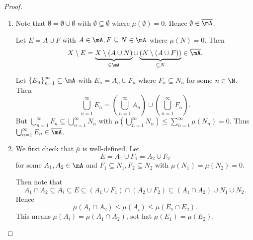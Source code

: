 \documentclass[pmath451]{subfiles}
\begin{document}
    \begin{proof}
        \begin{enumerate}
            \item Note that $\emptyset = \emptyset \cup \emptyset$ with $\emptyset\subseteq\emptyset$ where $\mu\left( \emptyset \right) = 0$. Hence $\emptyset\in\overline{\mA}$.

                Let $E = A\cup F$ with $A\in\mA, F\subseteq N\in\mA$ where $\mu\left( N \right) = 0$. Then
                \begin{equation*}
                    X\setminus E = \underbrace{X\setminus \left( A\cup N \right)}_{\in\mA} \cup \underbrace{\left( N\setminus \left( A\cup F \right) \right)}_{\subseteq N} \in\overline{\mA}.
                \end{equation*}

                Let $\left\lbrace E_n \right\rbrace^{\infty}_{n=1}\subseteq\mA$ with $E_n = A_n\cup F_n$ where $F_n\subseteq N_n$ for some $n\in\N$. Then
                \begin{equation*}
                    \bigcup^{\infty}_{n=1} E_n = \left( \bigcup^{\infty}_{n=1} A_n \right) \cup \left( \bigcup^{\infty}_{n=1} F_n \right).
                \end{equation*}
                But $\bigcup^{\infty}_{n=1} F_n\subseteq \bigcup^{\infty}_{n=1} N_n$ with $\mu\left( \bigcup^{\infty}_{n=1}N_n \right) \leq \sum^{\infty}_{n=1}\mu\left( N_n \right) = 0$. Thus $\bigcup^{\infty}_{n=1}E_n\in\overline{\mA}$.

            \item We first check that $\overline{\mu}$ is well-defined. Let
                \begin{equation*}
                    E = A_1\cup F_1 = A_2\cup F_2
                \end{equation*}
                for some $A_1,A_2\in\mA$ and $F_1\subseteq N_1, F_2\subseteq N_2$ with $\mu\left( N_1 \right) = \mu\left( N_2 \right) = 0$.

                Then note that
                \begin{equation*}
                    A_1\cap A_2\subseteq A_i \subseteq E \subseteq \left( A_1\cup F_1 \right)\cap \left( A_2\cup F_2 \right) \subseteq \left( A_1\cap A_2 \right) \cup N_1\cup N_2.
                \end{equation*}
                Hence
                \begin{equation*}
                    \mu\left( A_1\cap A_2 \right)\leq \mu\left( A_i \right) \leq \mu\left( E_1\cap E_2 \right).
                \end{equation*}
                This means $\mu\left( A_i \right) = \mu\left( A_1\cap A_2 \right)$, sot hat $\mu\left( E_1 \right) = \mu\left( E_2 \right)$.


\end{enumerate}
\end{proof}
\end{document}
